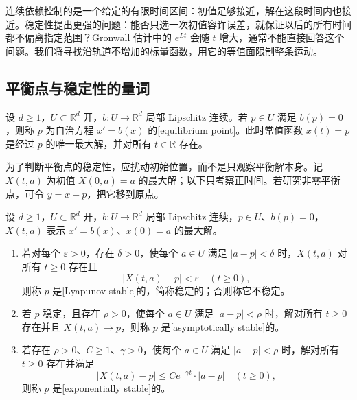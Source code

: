 
连续依赖控制的是一个给定的有限时间区间：初值足够接近，解在这段时间内也接近。稳定性提出更强的问题：能否只选一次初值容许误差，就保证以后的所有时间都不偏离指定范围？Gronwall 估计中的 \(e^{Lt}\) 会随 \(t\) 增大，通常不能直接回答这个问题。我们将寻找沿轨道不增加的标量函数，用它的等值面限制整条运动。

\subsection{平衡点与稳定性的量词}
\label{b2:subsec:ode-equilibrium-stability}

\begin{definition}\label{b2:def:ode-equilibrium}
设 \(d\geq1\)，\(U\subset\mathbb R^d\) 开，\(b:U\to\mathbb R^d\) 局部 Lipschitz 连续。若 \(p\in U\) 满足 \(b(p)=0\)，则称 \(p\) 为自治方程 \(x'=b(x)\) 的[equilibrium point]。此时常值函数 \(x(t)=p\) 是经过 \(p\) 的唯一最大解，并对所有 \(t\in\mathbb R\) 存在。
\end{definition}

为了判断平衡点的稳定性，应扰动初始位置，而不是只观察平衡解本身。记 \(X(t,a)\) 为初值 \(X(0,a)=a\) 的最大解；以下只考察正时间。若研究非零平衡点，可令 \(y=x-p\)，把它移到原点。

\begin{definition}\label{b2:def:ode-stability}
设 \(d\geq1\)，\(U\subset\mathbb R^d\) 开，\(b:U\to\mathbb R^d\) 局部 Lipschitz 连续，\(p\in U\)、\(b(p)=0\)，\(X(t,a)\) 表示 \(x'=b(x)\)、\(x(0)=a\) 的最大解。
\begin{enumerate}
\item\label{b2:item:ode-stable}若对每个 \(\varepsilon>0\)，存在 \(\delta>0\)，使每个 \(a\in U\) 满足 \(|a-p|<\delta\) 时，\(X(t,a)\) 对所有 \(t\geq0\) 存在且
\[
 |X(t,a)-p|<\varepsilon\quad(t\geq0),
\]
则称 \(p\) 是[Lyapunov stable]的，简称稳定的；否则称它不稳定。
\item\label{b2:item:ode-asymptotically-stable}若 \(p\) 稳定，且存在 \(\rho>0\)，使每个 \(a\in U\) 满足 \(|a-p|<\rho\) 时，解对所有 \(t\geq0\) 存在并且 \(X(t,a)\to p\)，则称 \(p\) 是[asymptotically stable]的。
\item\label{b2:item:ode-exponentially-stable}若存在 \(\rho>0\)、\(C\geq1\)、\(\gamma>0\)，使每个 \(a\in U\) 满足 \(|a-p|<\rho\) 时，解对所有 \(t\geq0\) 存在并满足
\[
 |X(t,a)-p|\leq C e^{-\gamma t}\cdot|a-p|\quad(t\geq0),
\]
则称 \(p\) 是[exponentially stable]的。
\end{enumerate}
\end{definition}

